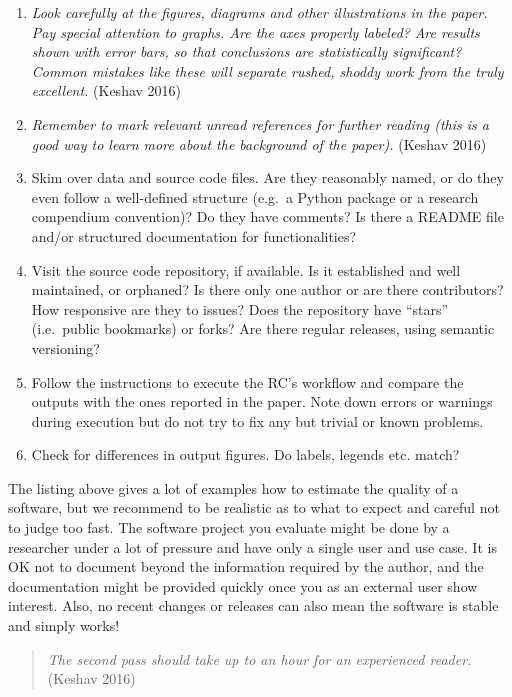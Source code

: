 \documentclass[fleqn,10pt]{wlpeerj} %
\providecommand{\tightlist}{
\setlength{\itemsep}{0pt}\setlength{\parskip}{0pt}}
\begin{document}
\begin{enumerate}
\def\labelenumi{\arabic{enumi}.}
\tightlist
\item
  \emph{Look carefully at the figures, diagrams and other illustrations
  in the paper. Pay special attention to graphs. Are the axes properly
  labeled?} \emph{Are results shown with error bars, so that conclusions
  are statistically significant? Common mistakes like these will
  separate rushed, shoddy work from the truly excellent.} (Keshav 2016)
\item
  \emph{Remember to mark relevant unread references for further reading
  (this is a good way to learn more about the background of the paper).}
  (Keshav 2016)
\item
  Skim over data and source code files. Are they reasonably named, or do
  they even follow a well-defined structure (e.g.~a Python package or a
  research compendium convention)? Do they have comments? Is there a
  README file and/or structured documentation for functionalities?
\item
  Visit the source code repository, if available. Is it established and
  well maintained, or orphaned? Is there only one author or are there
  contributors? How responsive are they to issues? Does the repository
  have ``stars'' (i.e.~public bookmarks) or forks? Are there regular
  releases, using semantic versioning?
\item
  Follow the instructions to execute the RC's workflow and compare the
  outputs with the ones reported in the paper. Note down errors or
  warnings during execution but do not try to fix any but trivial or
  known problems.
\item
  Check for differences in output figures. Do labels, legends etc.
  match?
\end{enumerate}

The listing above gives a lot of examples how to estimate the quality of
a software, but we recommend to be realistic as to what to expect and
careful not to judge too fast. The software project you evaluate might
be done by a researcher under a lot of pressure and have only a single
user and use case. It is OK not to document beyond the information
required by the author, and the documentation might be provided quickly
once you as an external user show interest. Also, no recent changes or
releases can also mean the software is stable and simply works!

\begin{quote}
\emph{The second pass should take up to an hour for an experienced
reader.} (Keshav 2016)
\end{quote}
\end{document}
